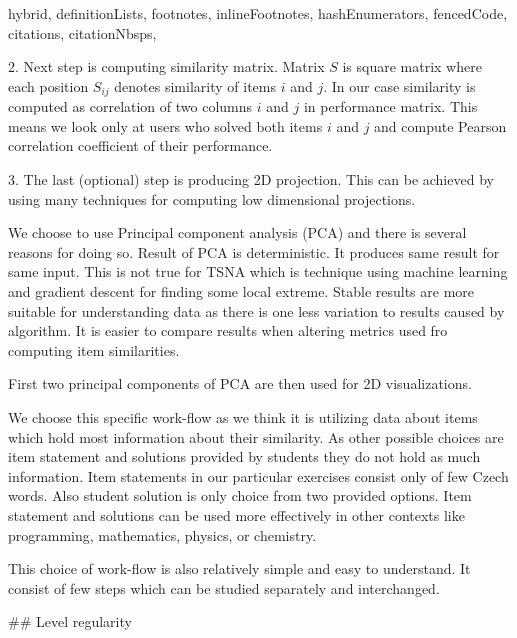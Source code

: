 \documentclass[
  digital, %
  table,   %
  nolof,     %
  nolot,     %
  nocover
]{fithesis3}
\begin{document}
\begin{markdown*}{%
  hybrid,
  definitionLists,
  footnotes,
  inlineFootnotes,
  hashEnumerators,
  fencedCode,
  citations,
  citationNbsps,
}

2. Next step is computing similarity matrix. Matrix $S$ is square matrix where each position $S_{ij}$ denotes similarity of items $i$ and $j$. In our case similarity is computed as correlation of two columns $i$ and $j$ in performance matrix. This means we look only at users who solved both items $i$ and $j$ and compute Pearson correlation coefficient of their performance.


3. The last (optional) step is producing 2D projection. This can be achieved by using many techniques for computing low dimensional projections.


We choose to use Principal component analysis (PCA) and there is several reasons for doing so.
Result of PCA is deterministic. It produces same result for same input. This is not true for TSNA which is technique using machine learning and gradient descent for finding some local extreme. Stable results are more suitable for understanding data as there is one less variation to results caused by algorithm. It is easier to compare results when altering metrics used fro computing item similarities.

First two principal components of PCA are then used for 2D visualizations.


We choose this specific work-flow as we think it is utilizing data about items which hold most information about their similarity. As other possible choices are item statement and solutions provided by students they do not hold as much information. Item statements in our particular exercises consist only of few Czech words. Also student solution is only choice from two provided options. Item statement and solutions can be used more effectively in other contexts like programming, mathematics, physics, or chemistry.

This choice of work-flow is also relatively simple and easy to understand. It consist of few steps which can be studied separately and interchanged.


## Level regularity




\end{markdown*}
\end{document}

